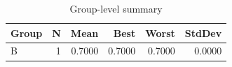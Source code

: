 \begin{table}[htbp]
\centering
\caption{Group-level summary}
\label{tab:group-summary}
\begin{tabular}{lrrrrr}
\toprule
\textbf{Group} & \textbf{N} & \textbf{Mean} & \textbf{Best} & \textbf{Worst} & \textbf{StdDev} \\
\midrule
B & 1 & 0.7000 & 0.7000 & 0.7000 & 0.0000 \\
\bottomrule
\end{tabular}
\end{table}